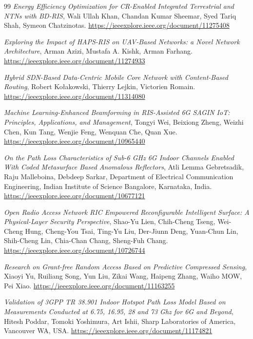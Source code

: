 \documentclass[twoside]{article}
\begin{document}
\begin{thebibliography}{99}
\textit{Energy Efficiency Optimization for CR-Enabled Integrated Terrestrial and NTNs with BD-RIS}, Wali Ullah Khan, Chandan Kumar Sheemar, Syed Tariq Shah, Symeon Chatzinotas. 
\url{https://ieeexplore.ieee.org/document/11275408}

\textit{Exploring the Impact of HAPS-RIS on UAV-Based Networks: a Novel Network Architecture}, Arman Azizi, Mustafa A. Kishk, Arman Farhang. 
\url{https://ieeexplore.ieee.org/document/11274933}

\textit{Hybrid SDN-Based Data-Centric Mobile Core Network with Content-Based Routing}, Robert Kołakowski, Thierry Lejkin, Victorien Romain. 
\url{https://ieeexplore.ieee.org/document/11314080}

\textit{Machine Learning-Enhanced Beamforming in RIS-Assisted 6G SAGIN IoT: Principles, Applications, and Management}, Tongyi Wei, Beixiong Zheng, Weizhi Chen, Kun Tang, Wenjie Feng, Wenquan Che, Quan Xue. 
\url{https://ieeexplore.ieee.org/document/10965440}

\textit{On the Path Loss Characteristics of Sub-6 GHz 6G Indoor Channels Enabled With Coded Metasurface Based Anomalous Reflectors}, Atli Lemma Gebretsadik, Raju Malleboina, Debdeep Sarkar, Department of Electrical Communication Engineering, Indian Institute of Science Bangalore, Karnataka, India. 
\url{https://ieeexplore.ieee.org/document/10677121}

\textit{Open Radio Access Network RIC Empowered Reconfigurable Intelligent Surface: A Physical-Layer Security Perspective}, Shao-Yu Lien, Chih-Cheng Tseng, Wei-Cheng Hung, Cheng-You Tsai, Ting-Yu Liu, Der-Jiunn Deng, Yuan-Chun Lin, Shih-Cheng Lin, Chia-Chan Chang, Sheng-Fuh Chang. 
\url{https://ieeexplore.ieee.org/document/10726744}

\textit{Research on Grant-free Random Access Based on Predictive Compressed Sensing}, Xiaoyi Yu, Ruiliang Song, Yun Liu, Zikai Wang, Haipeng Zhang, Waiho MOW, Pei Xiao. 
\url{https://ieeexplore.ieee.org/document/11163255}

\textit{Validation of 3GPP TR 38.901 Indoor Hotspot Path Loss Model Based on Measurements Conducted at 6.75, 16.95, 28 and 73 Ghz for 6G and Beyond}, Hitesh Poddar, Tomoki Yoshimura, Art Ishii, Sharp Laboratories of America, Vancouver WA, USA. 
\url{https://ieeexplore.ieee.org/document/11174821}

\end{thebibliography}
\end{document}
